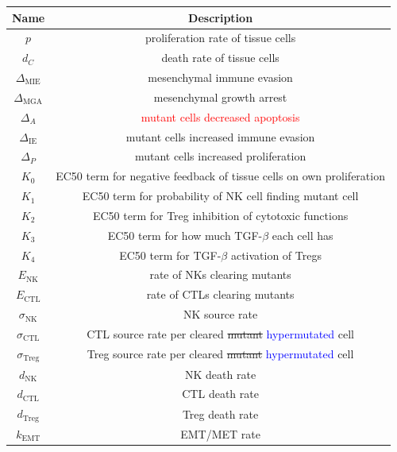 \documentclass[11pt]{article}
\newcommand{\tcr} { \textcolor{red} }
\newcommand{\tcb} { \textcolor{blue} }
\begin{document}
\begin{table}[H]
\begin{center}
 \begin{tabular}{|| c | c||} 
 \hline
 {\bf Name} & {\bf Description}  \\ [0.5ex] 
 \hline
 $p$ & proliferation rate of tissue cells \\ 
 \hline
 $d_C$  & death rate of tissue cells \\
 \hline
$\Delta_\text{MIE}$ &  mesenchymal immune evasion \\
 \hline
 $\Delta_\text{MGA}$ & mesenchymal growth arrest    \\
 \hline
  $\Delta_A$ & \tcr{mutant cells decreased apoptosis}  \\ %
  \hline
  $\Delta_\text{IE}$ & mutant cells increased immune evasion  \\
  \hline
  $\Delta_P$ & mutant cells increased proliferation  \\
  \hline
 $K_0$ & EC50 term for negative feedback of tissue cells on own proliferation\\
 \hline
 $K_1$ & EC50 term for probability of NK cell finding mutant cell\\
 \hline
  $K_2$ & EC50 term for Treg inhibition of cytotoxic functions  \\
  \hline
  $K_3$ & EC50 term for how much TGF-$\beta$ each cell has \\
  \hline
  $K_4$ & EC50 term for TGF-$\beta$ activation of Tregs \\
  \hline
 $E_\text{NK}$ & rate of NKs clearing mutants  \\
  \hline
  $E_\text{CTL}$ & rate of CTLs clearing mutants \\
  \hline
  $\sigma_\text{NK}$ & NK source rate \\ 
  \hline
  $\sigma_\text{CTL}$ & CTL source rate per cleared \sout{mutant} \tcb{hypermutated} cell \\ 
  \hline
  $\sigma_\text{Treg}$ & Treg source rate per cleared \sout{mutant} \tcb{hypermutated} cell \\ 
  \hline
  $d_\text{NK}$ & NK death rate \\ 
  \hline
  $d_\text{CTL}$ & CTL death rate \\ 
  \hline
  $d_\text{Treg}$ & Treg death rate \\ 
  \hline
  $k_\text{EMT}$ & EMT/MET rate  \\

\end{tabular}
\end{center}
\end{table}
\end{document}

